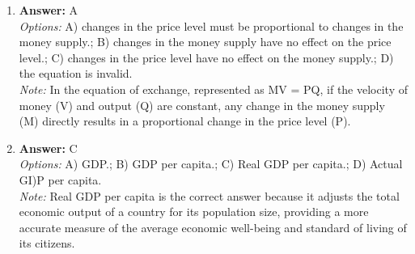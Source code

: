 \documentclass[12pt]{article}
\begin{document}
\begin{enumerate}[label=\arabic*.]
\item \textbf{Answer:} A
\\ \textit{Options:} A) changes in the price level must be proportional to changes in the money supply.; B) changes in the money supply have no effect on the price level.; C) changes in the price level have no effect on the money supply.; D) the equation is invalid.
\\ \textit{Note:} In the equation of exchange, represented as MV = PQ, if the velocity of money (V) and output (Q) are constant, any change in the money supply (M) directly results in a proportional change in the price level (P).
\item \textbf{Answer:} C
\\ \textit{Options:} A) GDP.; B) GDP per capita.; C) Real GDP per capita.; D) Actual GI)P per capita.
\\ \textit{Note:} Real GDP per capita is the correct answer because it adjusts the total economic output of a country for its population size, providing a more accurate measure of the average economic well-being and standard of living of its citizens.
\end{enumerate}
\end{document}
